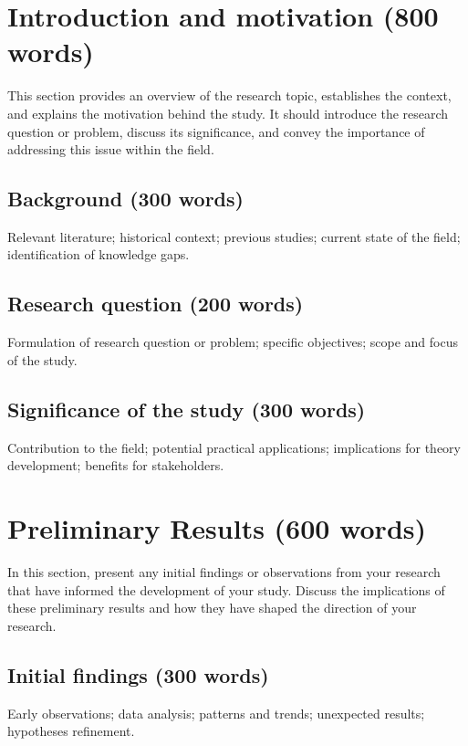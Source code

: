 \documentclass[journal,article,submit,pdftex,moreauthors]{Definitions/mdpi}
\begin{document}

%
%

\section{Introduction and motivation (800 words)} \label{sec:1}
This section provides an overview of the research topic, establishes the context, and explains the motivation behind the study. It should introduce the research question or problem, discuss its significance, and convey the importance of addressing this issue within the field.
\subsection{Background (300 words)} Relevant literature; historical context; previous studies; current state of the field; identification of knowledge gaps.

\subsection{Research question (200 words)} Formulation of research question or problem; specific objectives; scope and focus of the study.

\subsection{Significance of the study (300 words)} Contribution to the field; potential practical applications; implications for theory development; benefits for stakeholders.


%
%
\section{Preliminary Results (600 words)} \label{sec:2}
In this section, present any initial findings or observations from your research that have informed the development of your study. Discuss the implications of these preliminary results and how they have shaped the direction of your research.

\subsection{Initial findings (300 words)} Early observations; data analysis; patterns and trends; unexpected results; hypotheses refinement.
\end{document}
